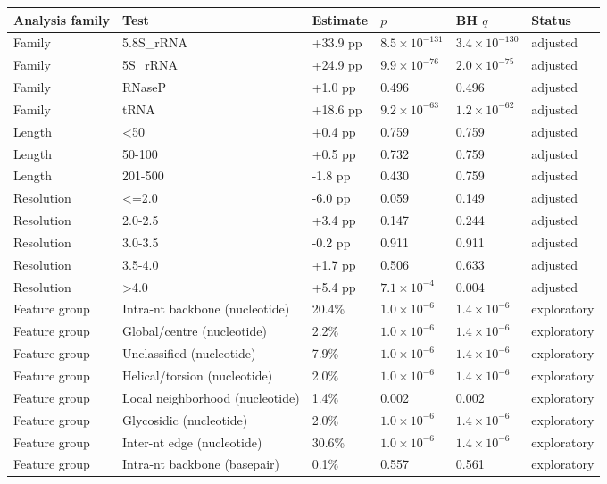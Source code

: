 \documentclass[pdflatex,sn-nature]{sn-jnl}
\begin{document}
\begingroup\scriptsize
\begin{adjustbox}{width=\textwidth}
\begin{tabular}{llllll}
\toprule
Analysis family & Test & Estimate & $p$ & BH $q$ & Status \\
\midrule
Family & 5.8S\_rRNA & +33.9 pp & $8.5\times10^{-131}$ & $3.4\times10^{-130}$ & adjusted \\
Family & 5S\_rRNA & +24.9 pp & $9.9\times10^{-76}$ & $2.0\times10^{-75}$ & adjusted \\
Family & RNaseP & +1.0 pp & 0.496 & 0.496 & adjusted \\
Family & tRNA & +18.6 pp & $9.2\times10^{-63}$ & $1.2\times10^{-62}$ & adjusted \\
Length & <50 & +0.4 pp & 0.759 & 0.759 & adjusted \\
Length & 50-100 & +0.5 pp & 0.732 & 0.759 & adjusted \\
Length & 201-500 & -1.8 pp & 0.430 & 0.759 & adjusted \\
Resolution & <=2.0 & -6.0 pp & 0.059 & 0.149 & adjusted \\
Resolution & 2.0-2.5 & +3.4 pp & 0.147 & 0.244 & adjusted \\
Resolution & 3.0-3.5 & -0.2 pp & 0.911 & 0.911 & adjusted \\
Resolution & 3.5-4.0 & +1.7 pp & 0.506 & 0.633 & adjusted \\
Resolution & >4.0 & +5.4 pp & $7.1\times10^{-4}$ & 0.004 & adjusted \\
Feature group & Intra-nt backbone (nucleotide) & 20.4\% & $1.0\times10^{-6}$ & $1.4\times10^{-6}$ & exploratory \\
Feature group & Global/centre (nucleotide) & 2.2\% & $1.0\times10^{-6}$ & $1.4\times10^{-6}$ & exploratory \\
Feature group & Unclassified (nucleotide) & 7.9\% & $1.0\times10^{-6}$ & $1.4\times10^{-6}$ & exploratory \\
Feature group & Helical/torsion (nucleotide) & 2.0\% & $1.0\times10^{-6}$ & $1.4\times10^{-6}$ & exploratory \\
Feature group & Local neighborhood (nucleotide) & 1.4\% & 0.002 & 0.002 & exploratory \\
Feature group & Glycosidic (nucleotide) & 2.0\% & $1.0\times10^{-6}$ & $1.4\times10^{-6}$ & exploratory \\
Feature group & Inter-nt edge (nucleotide) & 30.6\% & $1.0\times10^{-6}$ & $1.4\times10^{-6}$ & exploratory \\
Feature group & Intra-nt backbone (basepair) & 0.1\% & 0.557 & 0.561 & exploratory \\

\end{tabular}
\end{adjustbox}
\end{document}
